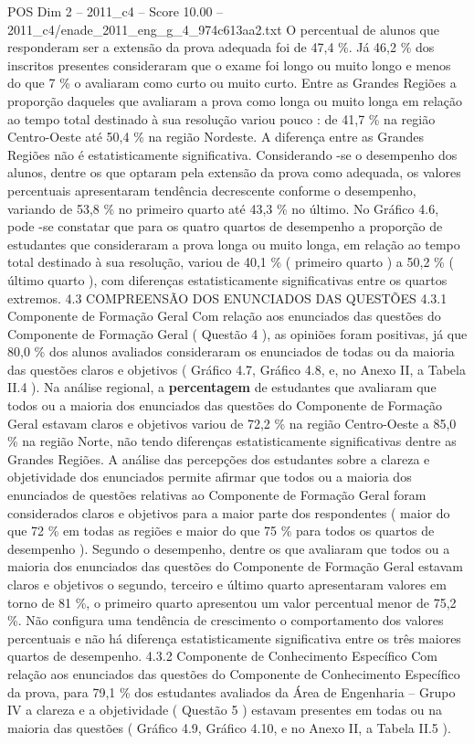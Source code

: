 \begin{textsample}{POS Dim 2 – 2011\_c4 – Score 10.00 – 2011\_c4/enade\_2011\_eng\_g\_4\_974c613aa2.txt}
O percentual de alunos que responderam ser a extensão da prova adequada foi de 47,4 \%.
Já 46,2 \% dos inscritos presentes consideraram que o exame foi longo ou muito longo e menos do que 7 \% o avaliaram como curto ou muito curto.
Entre as Grandes Regiões a proporção daqueles que avaliaram a prova como longa ou muito longa em relação ao tempo total destinado à sua resolução variou pouco : de 41,7 \% na região Centro-Oeste até 50,4 \% na região Nordeste.
A diferença entre as Grandes Regiões não é estatisticamente significativa.
Considerando -se o desempenho dos alunos, dentre os que optaram pela extensão da prova como adequada, os valores percentuais apresentaram tendência decrescente conforme o desempenho, variando de 53,8 \% no primeiro quarto até 43,3 \% no último.
No Gráfico 4.6, pode -se constatar que para os quatro quartos de desempenho a proporção de estudantes que consideraram a prova longa ou muito longa, em relação ao tempo total destinado à sua resolução, variou de 40,1 \% ( primeiro quarto ) a 50,2 \% ( último quarto ), com diferenças estatisticamente significativas entre os quartos extremos. 4.3 COMPREENSÃO DOS ENUNCIADOS DAS QUESTÕES 4.3.1 Componente de Formação Geral Com relação aos enunciados das questões do Componente de Formação Geral ( Questão 4 ), as opiniões foram positivas, já que 80,0 \% dos alunos avaliados consideraram os enunciados de todas ou da maioria das questões claros e objetivos ( Gráfico 4.7, Gráfico 4.8, e, no Anexo II, a Tabela II.4 ).
Na análise regional, a \textbf{percentagem} de estudantes que avaliaram que todos ou a maioria dos enunciados das questões do Componente de Formação Geral estavam claros e objetivos variou de 72,2 \% na região Centro-Oeste a 85,0 \% na região Norte, não tendo diferenças estatisticamente significativas dentre as Grandes Regiões.
A análise das percepções dos estudantes sobre a clareza e objetividade dos enunciados permite afirmar que todos ou a maioria dos enunciados de questões relativas ao Componente de Formação Geral foram considerados claros e objetivos para a maior parte dos respondentes ( maior do que 72 \% em todas as regiões e maior do que 75 \% para todos os quartos de desempenho ).
Segundo o desempenho, dentre os que avaliaram que todos ou a maioria dos enunciados das questões do Componente de Formação Geral estavam claros e objetivos o segundo, terceiro e último quarto apresentaram valores em torno de 81 \%, o primeiro quarto apresentou um valor percentual menor de 75,2 \%.
Não configura uma tendência de crescimento o comportamento dos valores percentuais e não há diferença estatisticamente significativa entre os três maiores quartos de desempenho. 4.3.2 Componente de Conhecimento Específico Com relação aos enunciados das questões do Componente de Conhecimento Específico da prova, para 79,1 \% dos estudantes avaliados da Área de Engenharia – Grupo IV a clareza e a objetividade ( Questão 5 ) estavam presentes em todas ou na maioria das questões ( Gráfico 4.9, Gráfico 4.10, e no Anexo II, a Tabela II.5 ).

\end{textsample}
